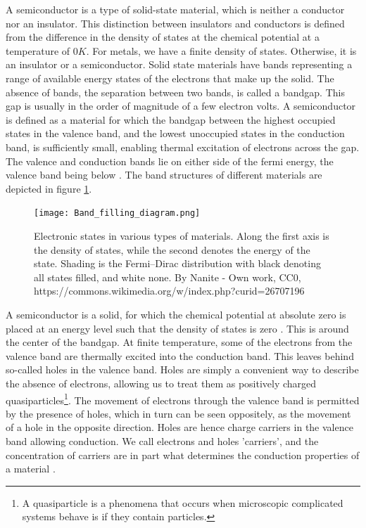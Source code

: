 \documentclass[../main.tex]{subfiles}
\begin{document}
	A semiconductor is a type of solid-state material, which is neither a conductor nor an insulator\cite{solidstatephysicsbook}. This distinction between insulators and conductors is defined from the difference in the density of states at the chemical potential at a temperature of $0K$\cite{solidstatephysicsbook}. For metals, we have a finite density of states. Otherwise, it is an insulator or a semiconductor. Solid state materials have bands representing a range of available energy states of the electrons that make up the solid. The absence of bands, the separation between two bands, is called a bandgap. This gap is usually in the order of magnitude of a few electron volts. A semiconductor is defined as a material for which the bandgap between the highest occupied states in the valence band, and the lowest unoccupied states in the conduction band, is sufficiently small, enabling thermal excitation of electrons across the gap. The valence and conduction bands lie on either side of the fermi energy, the valence band being below \cite{solidstatephysicsbook}. The band structures of different materials are depicted in figure \ref{fig:bands}.
	
	\begin{figure}[h!]
		\centering
		\texttt{[image: Band\_filling\_diagram.png]}
		\caption{Electronic states in various types of materials. Along the first axis is the density of states, while the second denotes the energy of the state. Shading is the Fermi–Dirac distribution with black denoting all states filled, and white none. By Nanite - Own work, CC0, https://commons.wikimedia.org/w/index.php?curid=26707196}
		\label{fig:bands}
	\end{figure}
	
	A semiconductor is a solid, for which the chemical potential at absolute zero is placed at an energy level such that the density of states is zero \cite{solidstatephysicsbook}. This is around the center of the bandgap. At finite temperature, some of the electrons from the valence band are thermally excited into the conduction band. This leaves behind so-called holes in the valence band. Holes are simply a convenient way to describe the absence of electrons, allowing us to treat them as positively charged quasiparticles\footnote{A quasiparticle is a phenomena that occurs when microscopic complicated systems behave is if they contain particles.}. The movement of electrons through the valence band is permitted by the presence of holes, which in turn can be seen oppositely, as the movement of a hole in the opposite direction. Holes are hence charge carriers in the valence band allowing conduction. We call electrons and holes 'carriers', and the concentration of carriers are in part what determines the conduction properties of a material \cite{solidstatephysicsbook}.  
	
\end{document}
